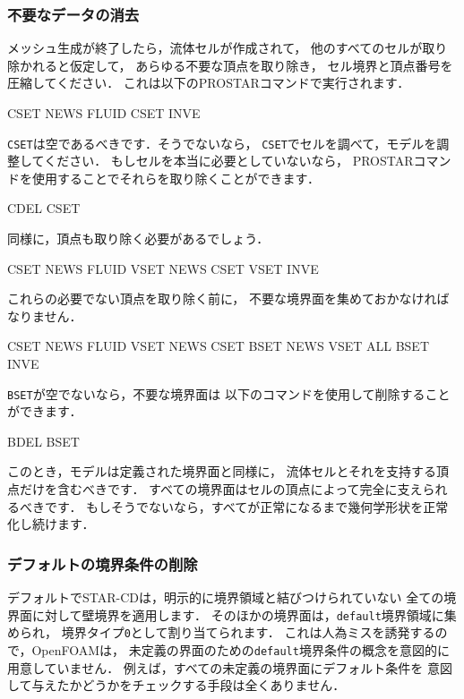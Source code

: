 \subsubsection{不要なデータの消去}
\label{sssec:5.5.2.2}
メッシュ生成が終了したら，流体セルが作成されて，
他のすべてのセルが取り除かれると仮定して，
あらゆる不要な頂点を取り除き，
セル境界と頂点番号を圧縮してください．
これは以下の\textsf{PROSTAR}コマンドで実行されます．
\begin{OFverbatim}[terminal]
CSET NEWS FLUID
CSET INVE
\end{OFverbatim}
\texttt{CSET}は空であるべきです．そうでないなら，
\texttt{CSET}でセルを調べて，モデルを調整してください．
もしセルを本当に必要としていないなら，
\textsf{PROSTAR}コマンドを使用することでそれらを取り除くことができます．
\begin{OFverbatim}[terminal]
CDEL CSET
\end{OFverbatim}
同様に，頂点も取り除く必要があるでしょう．
\begin{OFverbatim}[terminal]
CSET NEWS FLUID
VSET NEWS CSET
VSET INVE
\end{OFverbatim}
これらの必要でない頂点を取り除く前に，
不要な境界面を集めておかなければなりません．
\begin{OFverbatim}[terminal]
CSET NEWS FLUID
VSET NEWS CSET
BSET NEWS VSET ALL
BSET INVE
\end{OFverbatim}
\texttt{BSET}が空でないなら，不要な境界面は
以下のコマンドを使用して削除することができます．
\begin{OFverbatim}[terminal]
BDEL BSET
\end{OFverbatim}
このとき，モデルは定義された境界面と同様に，
流体セルとそれを支持する頂点だけを含むべきです．
すべての境界面はセルの頂点によって完全に支えられるべきです．
もしそうでないなら，すべてが正常になるまで幾何学形状を正常化し続けます．

\subsubsection{デフォルトの境界条件の削除}
\label{sssec:5.5.2.3}
デフォルトでSTAR-CDは，明示的に境界領域と結びつけられていない
全ての境界面に対して壁境界を適用します．
そのほかの境界面は，\texttt{default}境界領域に集められ，
境界タイプ\texttt{0}として割り当てられます．
これは人為ミスを誘発するので，OpenFOAMは，
未定義の界面のための\texttt{default}境界条件の概念を意図的に用意していません．
例えば，すべての未定義の境界面にデフォルト条件を
意図して与えたかどうかをチェックする手段は全くありません．

